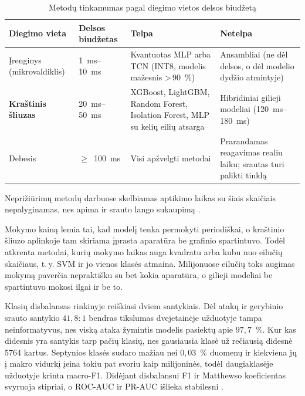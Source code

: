\begin{table}[htbp]
\centering
\caption{Metodų tinkamumas pagal diegimo vietos delsos biudžetą}
\label{tab:apribojimai}
\footnotesize
\setlength{\tabcolsep}{4pt}
\begin{tabularx}{\textwidth}{@{}
  >{\raggedright\arraybackslash}p{2.6cm}
  >{\raggedright\arraybackslash}p{2.0cm}
  >{\raggedright\arraybackslash}X
  >{\raggedright\arraybackslash}X@{}}
\toprule
\textbf{Diegimo vieta} & \textbf{Delsos biudžetas} & \textbf{Telpa}
  & \textbf{Netelpa} \\
\midrule
Įrenginys (mikro\-valdiklis) & \SIrange{1}{10}{\milli\second} &
  Kvantuotas MLP arba TCN (INT8, modelis mažesnis
  \textgreater\,90~\%) \cite{mazinani2026constrained} &
  Ansambliai (ne dėl delsos, o dėl modelio dydžio atmintyje) \\
\addlinespace
\textbf{Kraštinis šliuzas} & \SIrange{20}{50}{\milli\second} &
  XGBoost, LightGBM, Random Forest, Isolation Forest, MLP
  su kelių eilių atsarga &
  Hibridiniai gilieji modeliai
  (\SIrange{120}{180}{\milli\second}) \cite{nassef2026tinyml} \\
\addlinespace
Debesis & $\geq$~\SI{100}{\milli\second} & Visi apžvelgti metodai &
  Prarandamas reagavimas realiu laiku; srautas turi palikti tinklą \\
\bottomrule
\end{tabularx}
\end{table}

Neprižiūrimų metodų darbuose skelbiamas aptikimo laikas su šiais
skaičiais nepalyginamas, nes apima ir srauto lango sukaupimą
\cite{meidan2018nbaiot}.

Mokymo kainą lemia tai, kad modelį tenka permokyti periodiškai, o
kraštinio šliuzo aplinkoje tam skiriama įprasta aparatūra be grafinio
spartintuvo. Todėl atkrenta metodai, kurių mokymo laikas auga kvadratu
arba kubu nuo eilučių skaičiaus, t.\,y. SVM ir jo vienos klasės atmaina.
Milijonuose eilučių toks augimas mokymą paverčia nepraktišku su bet
kokia aparatūra, o gilieji modeliai be spartintuvo mokosi ilgai ir be to.

Klasių disbalansas rinkinyje reiškiasi dviem santykiais. Dėl atakų ir
gerybinio srauto santykio $41{,}8:1$ bendras tikslumas dvejetainėje
užduotyje tampa neinformatyvus, nes viską ataka žymintis modelis
pasiektų apie $97{,}7$~\%. Kur kas didesnis yra santykis tarp pačių
klasių, nes gausiausia klasė už rečiausią didesnė \num{5764} kartus.
Septynios klasės sudaro mažiau nei $0{,}03$~\% duomenų ir kiekviena jų į
makro vidurkį įeina tokiu pat svoriu kaip milijoninės, todėl
daugiaklasėje užduotyje krinta macro-F1. Didėjant disbalansui F1 ir
Matthewso koeficientas svyruoja stipriai, o ROC-AUC ir PR-AUC išlieka
stabilesni \cite{imani2025imbalance}.

